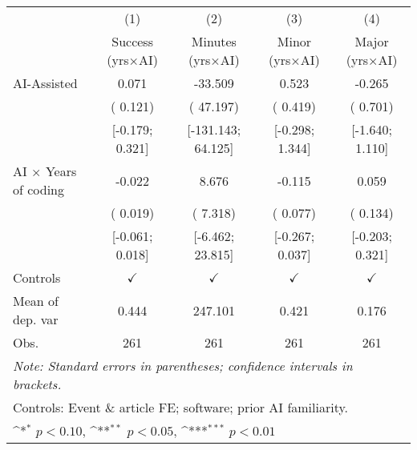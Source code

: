 \def\sym#1{\ifmmode^{#1}\else\(^{#1}\)\fi}
\begin{tabular}{l*{4}{c}}
\hline\hline
 & (1) & (2) & (3) & (4)
\\
 & Success (yrs×AI) & Minutes (yrs×AI) & Minor (yrs×AI) & Major (yrs×AI)
 \\
\hline
AI-Assisted &  0.071 & -33.509 &  0.523 & -0.265
\\
 & ( 0.121) & ( 47.197) & ( 0.419) & ( 0.701)
\\
 & [-0.179;  0.321] & [-131.143;  64.125] & [-0.298;  1.344] & [-1.640;  1.110]
\\
AI × Years of coding & -0.022 &  8.676 & -0.115 &  0.059
\\
 & ( 0.019) & ( 7.318) & ( 0.077) & ( 0.134)
\\
 & [-0.061;  0.018] & [-6.462;  23.815] & [-0.267;  0.037] & [-0.203;  0.321]
\\
\hline
Controls & $\checkmark$ & $\checkmark$ & $\checkmark$ & $\checkmark$
\\
Mean of dep. var &  0.444 &  247.101 &  0.421 &  0.176
\\
Obs. & 261 & 261 & 261 & 261
\\
\hline
\hline\hline
\multicolumn{5}{l}{\it{Note:} Standard errors in parentheses; confidence intervals in brackets.}\\
\multicolumn{5}{l}{Controls: Event \& article FE; software; prior AI familiarity.}\\
\multicolumn{5}{l}{\sym{*} $p<0.10$, \sym{**} $p<0.05$,  \sym{***} $p<0.01$}\\
\end{tabular}
